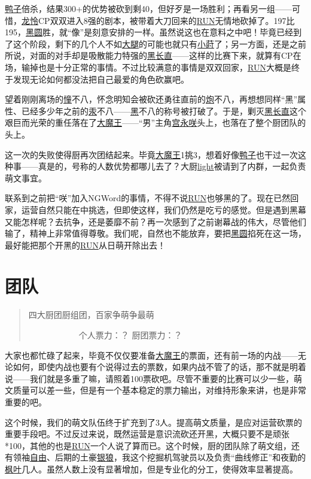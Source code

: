 \uline{鸭子}倍杀，结果300+的优势被砍到剩40，但好歹是一场胜利；再看另一组——可惜，\uline{龙}\uline{怜}CP双双进入8强的剧本，被带着大刀回来的\uline{RUN}无情地砍掉了。197比195，\uline{黑圆}胜，就“像”是刻意安排的一样。虽然说这也在意料之中吧！毕竟已经到了这个阶段，剩下的几个人不如\uline{大腿}的可能也就只有\uline{小莳}了；另一方面，还是之前所说，对面的对手却是吸散能力特强的\uline{黑长直}——这样的比赛下来，就算有CP在场，输掉也是十分正常的事情。不过比较满意的事情是双双回家，\uline{RUN}大概是终于发现无论如何都没法把自己最爱的角色砍赢吧。

望着刚刚离场的\uline{憧}不八，怀念明知会被砍还勇往直前的\uline{炮}不八，再想想同样“黑”属性、已经多少年之前的\uline{汞}不八——\uline{黑}不八的称号被打破了。于是，剿灭\uline{黑长直}这个艰巨而光荣的重任落在了\uline{大魔王}——“男”主角\uline{宫永咲}头上，也落在了整个厨团队的头上。

这一次的失败使得厨再次团结起来。毕竟\uline{大魔王}1挑3，想着好像\uline{鸭子}也干过一次这种事——真是的，号称的人数优势都哪儿去了？大厨\uline{light}被请到了内群，一起负责萌文事宜。

联系到之前把“咲”加入NGWord的事情，不得不说\uline{RUN}也够黑的了。现在已然回家，运营自然只能在中挑选，但即使这样，我们仍然是吃亏的感觉。但是遇到黑幕又能怎样呢？去抗争，还是萎靡不前？再一次感到了之前谢幕战的伟大，尽管他们输了，精神上非常值得尊敬。我们呢，自然也不能放弃，要把\uline{黑圆}掐死在这一场，最好能把那个开黑的\uline{RUN}从日萌开除出去！

\chapter{团队}
\begin{quote}
四大厨团厨组团，百家争萌争最萌

　　　　　　个人票力：？ 厨团票力：？
\end{quote}

大家也都忙碌了起来，毕竟不仅仅要准备\uline{大魔王}的票面，还有前一场的内战——无论如何，即使内战也要有个说得过去的票数，如果内战不管了的话，那不就是明着说——我们就是多重了嘛，请照着100票砍吧。尽管不重要的比赛可以少一些，萌文质量可以差一些，但是有一个基本稳定的票力输出，对维持形象来讲，也是非常重要的吧。

这个时候，我们的萌文队伍终于扩充到了3人。提高萌文质量，是应对运营砍票的重要手段吧。不过反过来说，既然运营是意识流砍还开黑，大概只要不是顽张*100，其他的也是\uline{RUN}一个人说了算而已。这个时候，厨的团队除了萌文组，还有领袖\uline{自由}、后期的土豪\uline{银狼}，我这个挖掘机驾驶员以及负责“曲线修正”和夜勤的\uline{枫叶}几人。虽然人数上没有显著增加，但是专业化的分工，使得效率显著提高。

